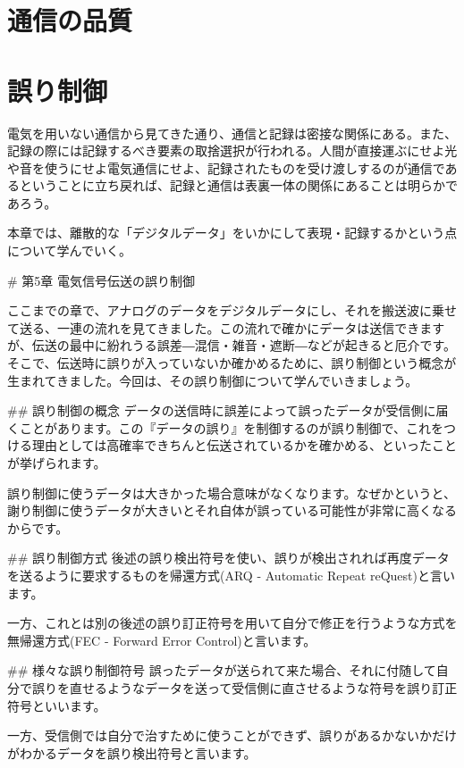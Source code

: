 \section{通信の品質}

\section{誤り制御}

電気を用いない通信から見てきた通り、通信と記録は密接な関係にある。また、記録の際には記録するべき要素の取捨選択が行われる。人間が直接運ぶにせよ光や音を使うにせよ電気通信にせよ、記録されたものを受け渡しするのが通信であるということに立ち戻れば、記録と通信は表裏一体の関係にあることは明らかであろう。

本章では、離散的な「デジタルデータ」をいかにして表現・記録するかという点について学んでいく。





# 第5章 電気信号伝送の誤り制御

ここまでの章で、アナログのデータをデジタルデータにし、それを搬送波に乗せて送る、一連の流れを見てきました。この流れで確かにデータは送信できますが、伝送の最中に紛れうる誤差―混信・雑音・遮断―などが起きると厄介です。そこで、伝送時に誤りが入っていないか確かめるために、誤り制御という概念が生まれてきました。今回は、その誤り制御について学んでいきましょう。

## 誤り制御の概念
データの送信時に誤差によって誤ったデータが受信側に届くことがあります。この『データの誤り』を制御するのが誤り制御で、これをつける理由としては高確率できちんと伝送されているかを確かめる、といったことが挙げられます。

誤り制御に使うデータは大きかった場合意味がなくなります。なぜかというと、謝り制御に使うデータが大きいとそれ自体が誤っている可能性が非常に高くなるからです。

## 誤り制御方式
後述の誤り検出符号を使い、誤りが検出されれば再度データを送るように要求するものを帰還方式(ARQ - Automatic Repeat reQuest)と言います。

一方、これとは別の後述の誤り訂正符号を用いて自分で修正を行うような方式を無帰還方式(FEC - Forward Error Control)と言います。

## 様々な誤り制御符号
誤ったデータが送られて来た場合、それに付随して自分で誤りを直せるようなデータを送って受信側に直させるような符号を誤り訂正符号といいます。

一方、受信側では自分で治すために使うことができず、誤りがあるかないかだけがわかるデータを誤り検出符号と言います。

